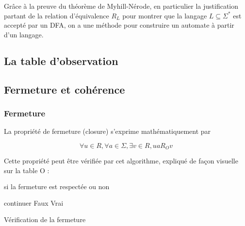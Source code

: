 	\begin{corollary}
		Grâce à la preuve du théorème de Myhill-Nérode, en particulier la justification partant de la relation d'équivalence $R_L$ pour montrer que la langage $L\subseteq\Sigma^*$ est accepté par un DFA, on a une méthode pour construire un automate à partir d'un langage.
	\end{corollary}



  \subsection{La table d'observation}



\subsection{Fermeture et cohérence}

\subsubsection*{Fermeture}
La propriété de fermeture (closure) s'exprime mathématiquement par

$$ \forall u \in R, \forall a \in \Sigma, \exists v \in R, ua R_O v$$

Cette propriété peut être vérifiée par cet algorithme, expliqué de façon visuelle sur la table O :

\begin{algorithm}[H]
	\begin{algorithmic}[1]
		\ENSURE si la fermeture est respectée ou non

				\STATE continuer
			\ELSE
				\STATE {}
					\RETURN Faux
				\ENDIF
			\ENDIF
		\ENDFOR
		\ENDFOR
		\RETURN Vrai
	\end{algorithmic}
	\caption{Vérification de la fermeture}\label{alg:closure}
\end{algorithm}

